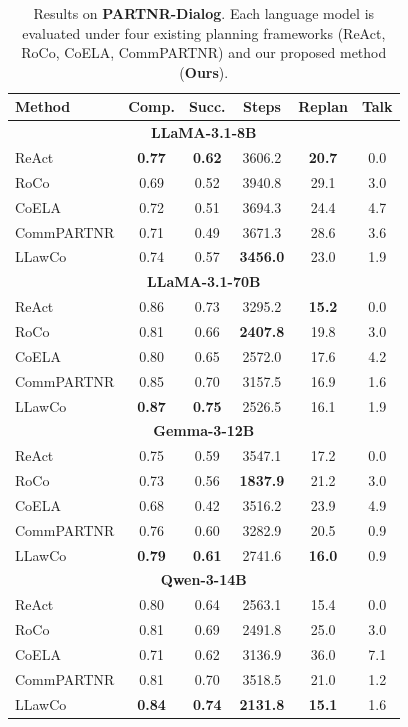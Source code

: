 \documentclass{article}
\theoremstyle{plain}
\theoremstyle{definition}
\theoremstyle{remark}
\newcommand{\name}{LLawCo\xspace}
\begin{document}
\begin{table}[htpb]
\centering
\small
\setlength{\tabcolsep}{5pt}
\caption{Results on \textbf{PARTNR-Dialog}. Each language model is evaluated under four existing planning frameworks (ReAct, RoCo, CoELA, CommPARTNR) and our proposed method (\textbf{Ours}).}
\label{tab:communicative-partnr}
\begin{tabular}{l|ccccc}
\toprule
\textbf{Method} & \textbf{Comp.} & \textbf{Succ.} & \textbf{Steps} & \textbf{Replan} & \textbf{Talk} \\
\midrule

\multicolumn{6}{c}{\textbf{LLaMA-3.1-8B}} \\
 ReAct        & \textbf{0.77} & \textbf{0.62} & 3606.2 & \textbf{20.7} & 0.0 \\
 RoCo         & 0.69 & 0.52 & 3940.8 & 29.1 & 3.0 \\
 CoELA        & 0.72 & 0.51 & 3694.3 & 24.4 & 4.7 \\
 CommPARTNR  & 0.71 & 0.49 & 3671.3 & 28.6 & 3.6 \\
 \name         & 0.74 & 0.57 & \textbf{3456.0} & 23.0 & 1.9 \\

\midrule
\multicolumn{6}{c}{\textbf{LLaMA-3.1-70B}} \\
 ReAct        & 0.86 & 0.73 & 3295.2 & \textbf{15.2} & 0.0 \\
 RoCo         & 0.81 & 0.66 & \textbf{2407.8} & 19.8 & 3.0 \\
 CoELA        & 0.80 & 0.65 & 2572.0 & 17.6 & 4.2 \\
 CommPARTNR  & 0.85 & 0.70 & 3157.5 & 16.9 & 1.6 \\
 \name         & \textbf{0.87} & \textbf{0.75} & 2526.5 & 16.1 & 1.9 \\

\midrule
\multicolumn{6}{c}{\textbf{Gemma-3-12B}} \\
 ReAct        & 0.75 & 0.59 & 3547.1 & 17.2 & 0.0 \\
 RoCo         & 0.73 & 0.56 & \textbf{1837.9} & 21.2 & 3.0 \\
 CoELA        & 0.68 & 0.42 & 3516.2 & 23.9 & 4.9 \\
 CommPARTNR  & 0.76 & 0.60 & 3282.9 & 20.5 & 0.9 \\
 \name         & \textbf{0.79} & \textbf{0.61} & 2741.6 & \textbf{16.0} & 0.9 \\

\midrule
\multicolumn{6}{c}{\textbf{Qwen-3-14B}} \\
 ReAct        & 0.80 & 0.64 & 2563.1 & 15.4 & 0.0 \\
 RoCo         & 0.81 & 0.69 & 2491.8 & 25.0 & 3.0 \\
 CoELA        & 0.71 & 0.62 & 3136.9 & 36.0 & 7.1 \\
 CommPARTNR  & 0.81 & 0.70 & 3518.5 & 21.0 & 1.2 \\
 \name         & \textbf{0.84} & \textbf{0.74} & \textbf{2131.8} & \textbf{15.1} & 1.6 \\

\bottomrule
\end{tabular}
\end{table}
\end{document}
